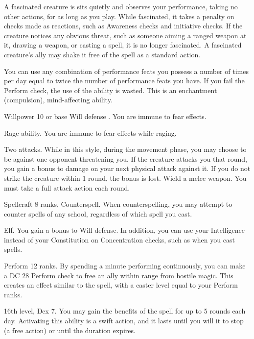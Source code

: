 A fascinated creature is sits quietly and observes your performance, taking no other actions, for as long as you play.
While fascinated, it takes a  penalty on checks made as reactions, such as Awareness checks and initiative checks.
If the creature notices any obvious threat, such as someone aiming a ranged weapon at it, drawing a weapon, or casting a spell, it is no longer fascinated.
A fascinated creature's ally may shake it free of the spell as a standard action.

You can use any combination of performance feats you possess a number of times per day equal to twice the number of performance feats you have.
If you fail the Perform check, the use of the ability is wasted.
This is an enchantment (compulsion), mind-affecting ability.

\featpre Willpower 10 or base Will defense .
\featben You are immune to fear effects.

\featpre Rage ability.
\featben You are immune to fear effects while raging.

\featpre Two attacks.
\featben While in this style, during the movement phase, you may choose to be  against one opponent threatening you.
If the creature attacks you that round, you gain a  bonus to damage on your next physical attack against it.
If you do not strike the creature within 1 round, the bonus is lost.
\stylereq Wield a melee weapon.
You must take a full attack action each round.

\featpre Spellcraft 8 ranks, Counterspell.
\featben When counterspelling, you may attempt to counter spells of any school, regardless of which spell you cast.

\featpre Elf.
\featben You gain a  bonus to Will defense.
In addition, you can use your Intelligence instead of your Constitution on Concentration checks, such as when you cast spells.

\featpre Perform 12 ranks.
\featben By spending a minute performing continuously, you can make a DC 28 Perform check to free an ally within \rngmed range from hostile magic.
This creates an effect similar to the 
spell, with a caster level equal to your Perform ranks.

\featpre 16th level, Dex 7.
\featben You may gain the benefits of the 
spell for up to 5 rounds each day.
Activating this ability is a swift action, and it lasts until you will it to stop (a free action) or until the duration expires.

